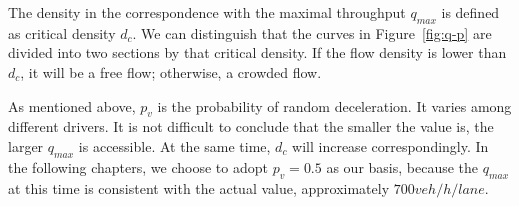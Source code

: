\documentclass{mcmthesis}
\begin{document}
The density in the correspondence with the maximal throughput $q_{max}$ is
defined as critical density $d_{c}$. We can distinguish that the curves in
Figure~\ref{fig:q-p} are divided into two sections by that critical density.
If the flow density is lower than $d_{c}$, it will be a free flow; otherwise,
a crowded flow.

As mentioned above, ${p}_{v}$ is the probability of random deceleration.
It varies among different drivers. It is not difficult to conclude
that the smaller the value is, the larger $q_{max}$ is accessible. At the same
time, $d_{c}$ will increase correspondingly. In the following chapters, we
choose to adopt ${p}_{v}=0.5$ as our basis, because the $q_{max}$ at this time is
consistent with the actual value, approximately $700veh/h/lane$.
\end{document}
